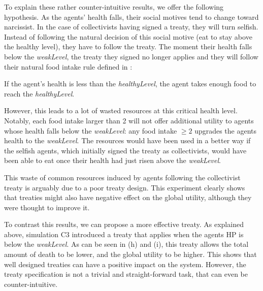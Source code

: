To explain these rather counter-intuitive results, we offer the following hypothesis. As the agents' health falls, their social motives tend to change toward narcissist. In the case of collectivists having signed a treaty, they will turn selfish. Instead of following the natural decision of this social motive (eat to stay above the healthy level), they have to follow the treaty. The moment their health falls below the \textit{weakLevel}, the treaty they signed no longer applies and they will follow their natural food intake rule defined in :

If the agent's health is less than the \textit{healthyLevel}, the agent takes enough food to reach the \textit{healthyLevel}.

However, this leads to a lot of wasted resources at this critical health level. Notably, each food intake larger than 2 will not offer additional utility to agents whose health falls below the \textit{weakLevel}: any food intake $\geq2$ upgrades the agents health to the \textit{weakLevel}. The resources would have been used in a better way if the selfish agents, which initially signed the treaty as collectivists, would have been able to eat once their health had just risen above the \textit{weakLevel}.

This waste of common resources induced by agents following the collectivist treaty is arguably due to a poor treaty design. This experiment clearly shows that treaties might also have negative effect on the global utility, although they were thought to improve it.

To contrast this results, we can propose a more effective treaty. As explained above, simulation C3 introduced a treaty that applies when the agents HP is below the \textit{weakLevel}. As can be seen in  (h) and (i), this treaty allows the total amount of death to be lower, and the global utility to be higher. This shows that well designed treaties can have a positive impact on the system. However, the treaty specification is not a trivial and straight-forward task, that can even be counter-intuitive.



